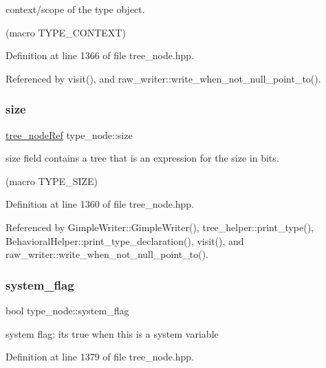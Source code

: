 context/scope of the type object. 

(macro T\+Y\+P\+E\+\_\+\+C\+O\+N\+T\+E\+XT) 

Definition at line 1366 of file tree\+\_\+node.\+hpp.



Referenced by visit(), and raw\+\_\+writer\+::write\+\_\+when\+\_\+not\+\_\+null\+\_\+point\+\_\+to().

\mbox{\label{structtype__node_ade610e1eb89ba3790aadbb88de89ba81}} 
\subsubsection{\texorpdfstring{size}{size}}
{\footnotesize\ttfamily \hyperlink{tree__node_8hpp_a6ee377554d1c4871ad66a337eaa67fd5}{tree\+\_\+node\+Ref} type\+\_\+node\+::size}



size field contains a tree that is an expression for the size in bits. 

(macro T\+Y\+P\+E\+\_\+\+S\+I\+ZE) 

Definition at line 1360 of file tree\+\_\+node.\+hpp.



Referenced by Gimple\+Writer\+::\+Gimple\+Writer(), tree\+\_\+helper\+::print\+\_\+type(), Behavioral\+Helper\+::print\+\_\+type\+\_\+declaration(), visit(), and raw\+\_\+writer\+::write\+\_\+when\+\_\+not\+\_\+null\+\_\+point\+\_\+to().

\mbox{\label{structtype__node_ad4abd137200c754b98ab844cbb17bfc8}} 
\subsubsection{\texorpdfstring{system\+\_\+flag}{system\_flag}}
{\footnotesize\ttfamily bool type\+\_\+node\+::system\+\_\+flag}



system flag\+: it\textquotesingle{}s true when this is a system variable 



Definition at line 1379 of file tree\+\_\+node.\+hpp.



